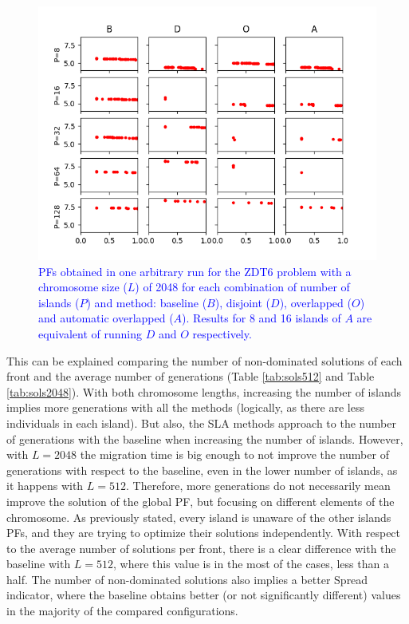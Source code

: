 \documentclass[preprint]{elsarticle}
\begin{document}
\begin{figure}
\centering
\includegraphics[width=12cm]{plot_zdt6_2048.png}
\caption{\textcolor{blue}{PFs obtained in one arbitrary run for the ZDT6 problem with a chromosome size ($L$) of 2048 for each combination of number of islands ($P$) and method: baseline ($B$), disjoint ($D$), overlapped ($O$) and automatic overlapped ($A$). Results for 8 and 16 islands of $A$ are equivalent of running $D$ and $O$ respectively. }}
\label{fig:plot_zdt6_2048}
\end{figure}



This can be explained comparing the number of non-dominated solutions
of each front and the average number of generations (Table
\ref{tab:sols512} and Table \ref{tab:sols2048}). With both chromosome
lengths, increasing the number of islands implies more generations
with all the methods (logically, as there are less individuals in each
island). But also, the SLA methods
approach to the number of generations with the baseline when
increasing the number of islands. However, with $L=2048$ the migration
time is big enough  to not improve the number of generations
with respect to the baseline, even in the lower number of islands, as
it happens with $L=512$. Therefore, more generations do not
necessarily mean improve the solution of the global PF, but focusing on
different elements of the chromosome. As  previously stated, every
island is unaware of the other islands PFs, and they are trying to
optimize their solutions independently. With respect to the average
number of solutions per front, there is a clear difference 
 with the baseline with $L=512$, where this value is in the most
of the cases, less than a half. The number of non-dominated solutions
also implies a better Spread indicator, where the baseline 
 obtains better (or not significantly different) values in the majority of the compared configurations.
\end{document}
